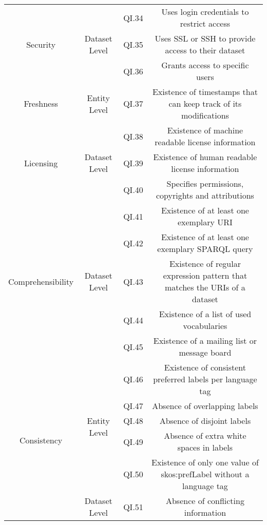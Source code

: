 \documentclass[onecolumn, crcready]{iosart2c}
\begin{document}
\begin{landscape}
\begin{center}
{\begin{longtable}[h]{|c|c|c|c|}
\hline
\hline
\multirow{3}{*}{Security} & \multirow{3}{*}{Dataset Level} & QI.34 & Uses login credentials to restrict access \cite{Framework2012}\tabularnewline
\cline{3-4}
 &  & QI.35 & Uses SSL or SSH to provide access to their dataset \cite{Framework2012}\tabularnewline
\cline{3-4}
 &  & QI.36 & Grants access to specific users \cite{Framework2012}\tabularnewline
\hline
\hline
\multirow{1}{*}{Freshness} & \multirow{1}{*}{Entity Level} & QI.37 & Existence of timestamps that can keep track of its modifications  \cite{Flouris2012}\tabularnewline
\hline
\hline
\multirow{3}{*}{Licensing} & \multirow{3}{*}{Dataset Level} & QI.38 & Existence of machine readable license information \cite{Hogan:2012:ESL:2263498.2264570}\tabularnewline
\cline{3-4}
 &  & QI.39 & Existence of human readable license information  \cite{Hogan:2012:ESL:2263498.2264570}\tabularnewline
\cline{3-4}
 &  & QI.40 & Specifies permissions, copyrights and attributions  \cite{Framework2012}\tabularnewline
\hline
\hline
\multirow{5}{*}{Comprehensibility} & \multirow{5}{*}{Dataset Level} & QI.41 & Existence of at least one exemplary URI \cite{Framework2012}\tabularnewline
\cline{3-4}
 &  & QI.42 & Existence of at least one exemplary SPARQL query \cite{Framework2012}\tabularnewline
\cline{3-4}
 &  & QI.43 & Existence of regular expression pattern that matches the URIs of a dataset \cite{Framework2012}\tabularnewline
\cline{3-4}
 &  & QI.44 & Existence of a list of used vocabularies \tabularnewline
\cline{3-4}
 &  & QI.45 & Existence of a mailing list or message board \cite{flemming2010}\tabularnewline
\hline
\multirow{11}{*}{Consistency} & \multirow{5}{*}{Entity Level} & QI.46 & Existence of consistent preferred labels per language tag \cite{skosprimer}\cite{Mader2012}\tabularnewline
\cline{3-4}
 &  & QI.47 & Absence of overlapping labels\tabularnewline
\cline{3-4}
 &  & QI.48 & Absence of disjoint labels \cite{Mader2012}\tabularnewline
\cline{3-4}
 &  & QI.49 & Absence of extra white spaces in labels \cite{Suominen:2012:IQS:2413941.2413985}\tabularnewline
\cline{3-4}
 &  & QI.50 & Existence of only one value of skos:prefLabel without a language tag  \cite{Mader2012}\cite{Suominen:2012:IQS:2413941.2413985}\tabularnewline
\cline{2-4}
 & \multirow{1}{*}{Dataset Level} & QI.51 & Absence of conflicting information \cite{Mendes2012}\tabularnewline

\end{longtable}}
\end{center}
\end{landscape}
\end{document}
